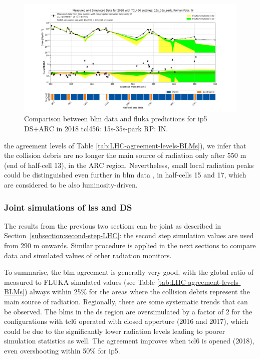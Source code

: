 \documentclass[encoding=utf8,british]{tumphthesis}
\begin{document}
\begin{figure}[H]
    \centering
    \includegraphics[width=0.9\linewidth]{results/2018_300_700m.png}
    \caption{Comparison between \acrshort{blm} data and \acrshort{fluka} predictions for \acrshort{ip}5 DS+ARC in 2018 \acrshort{tcl}456: 15s-35s-park RP: IN.}
    \label{fig:blm-benchmark-IP5-2018-DS+ARC}
\end{figure}

the agreement levels of Table \ref{tab:LHC-agreement-levels-BLMs}), we infer that the collision debris are no longer the main source of radiation only after 550 m (end of half-cell 13), in the ARC region. Nevertheless, small local radiation peaks could be distinguished even further in \acrshort{blm} data \cite{Bilko:2692574}, in half-cells 15 and 17, which are considered to be also luminosity-driven.
 
\subsubsection{Joint simulations of \acrshort{lss} and DS}

The results from the previous two sections can be joint as described in Section~\ref{subsection:second-step-LHC}: the second step simulation values are used from 290 m onwards. Similar procedure is applied in the next sections to compare data and simulated values of other radiation monitors.

To summarise, the \acrshort{blm} agreement is generally very good, with the global ratio of measured to FLUKA simulated values (see Table \ref{tab:LHC-agreement-levels-BLMs}) always within 25\% for the areas where the collision debris represent the main source of radiation. Regionally, there are some systematic trends that can be observed. The \acrshort{blm}s in the \acrshort{ds} region are oversimulated by a factor of 2 for the configurations with \acrshort{tcl}6 operated with closed apperture (2016 and 2017), which could be due to the significantly lower radiation levels leading to poorer simulation statistics as well. The agreement improves when \acrshort{tcl}6 is opened (2018), even overshooting within 50\% for \acrshort{ip}5.
\end{document}
